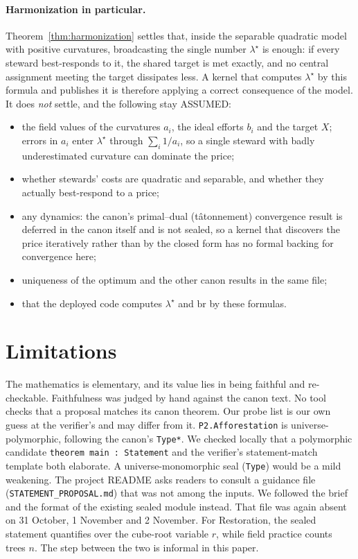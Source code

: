 \documentclass[11pt]{article}
\theoremstyle{definition}
\theoremstyle{remark}
\begin{document}
\paragraph{Harmonization in particular.} Theorem~\ref{thm:harmonization} settles that, inside the separable quadratic model
with positive curvatures, broadcasting the single number $\lambda^\star$ is enough: if every steward best-responds to it, the
shared target is met exactly, and no central assignment meeting the target dissipates less. A kernel that computes $\lambda^\star$
by this formula and publishes it is therefore applying a correct consequence of the model.
It does \emph{not} settle, and the following stay ASSUMED:
\begin{itemize}
\item the field values of the curvatures $a_i$, the ideal efforts $b_i$ and the target $X$; errors in $a_i$ enter $\lambda^\star$
through $\sum_i 1/a_i$, so a single steward with badly underestimated curvature can dominate the price;
\item whether stewards' costs are quadratic and separable, and whether they actually best-respond to a price;
\item any dynamics: the canon's primal--dual (t\^atonnement) convergence result is deferred in the canon itself and is not sealed,
so a kernel that discovers the price iteratively rather than by the closed form has no formal backing for convergence here;
\item uniqueness of the optimum and the other canon results in the same file;
\item that the deployed code computes $\lambda^\star$ and $\mathrm{br}$ by these formulas.
\end{itemize}

\section{Limitations}
The mathematics is elementary, and its value lies in being faithful and re-checkable.
Faithfulness was judged by hand against the canon text. No tool checks that a proposal matches its canon theorem.
Our probe list is our own guess at the verifier's and may differ from it.
\texttt{P2.Afforestation} is universe-polymorphic, following the canon's \texttt{Type*}. We checked locally that a polymorphic
candidate \texttt{theorem main : Statement} and the verifier's statement-match template both elaborate.
A universe-monomorphic seal (\texttt{Type}) would be a mild weakening.
The project README asks readers to consult a guidance file (\texttt{STATEMENT\_PROPOSAL.md}) that was not among the inputs.
We followed the brief and the format of the existing sealed module instead. That file was again absent on 31 October, 1 November and 2 November.
For Restoration, the sealed statement quantifies over the cube-root variable $r$, while field practice counts trees $n$.
The step between the two is informal in this paper.
\end{document}
